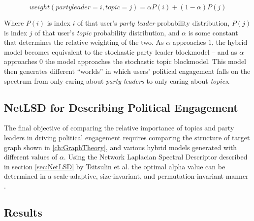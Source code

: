 \begin{equation}
    weight(party leader=i, topic=j)=\alpha P(i)+(1-\alpha)P(j)
\end{equation}

Where $P(i)$ is index $i$ of that user's \emph{party leader} probability
distribution, $P(j)$ is index $j$ of that user's \emph{topic} probability
distribution, and $\alpha$ is some constant that determines the relative
weighting of the two. As $\alpha$ approaches $1$, the hybrid model becomes
equivalent to the stochastic party leader blockmodel -- and as $\alpha$
approaches $0$ the model approaches the stochastic topic blockmodel. This model
then generates different ``worlds'' in which users' political engagement falls on
the spectrum from only caring about \emph{party leaders} to only caring about
\emph{topics}.

\subsection{NetLSD for Describing Political Engagement}\label{sec:NetLSDForSBM}

The final objective of comparing the relative importance of topics and party
leaders in driving political engagement requires comparing the structure of
target graph shown in \ref{ch:GraphTheory}, and various hybrid models
generated with different values of $\alpha$. Using the Network Laplacian
Spectral Descriptor described in section \ref{sec:NetLSD} by Tsitsulin et al.
the optimal alpha value can be determined in a scale-adaptive, size-invariant,
and permutation-invariant manner \cite{netlsd}.

\subsection{Results}\label{sec:SBMsResults}

